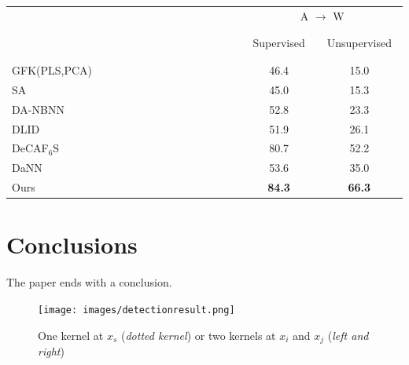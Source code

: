 \documentclass[runningheads]{llncs}
\begin{document}
\begin{table}
\centering
\begin{tabular}{l c c}
  \hline
   & \multicolumn{2}{c}{A $\rightarrow$ W}    \\
   \cline{2-3}
   ~~~~~~~~~~~~~~~~~~~~~~~~~~~~~~~
   ~~~~~~~~~~~~~~~~~~~~~~~~~~~~~~~
    & ~Supervised~ & ~Unsupervised~ \\
  \hline
  GFK(PLS,PCA)\cite{gong2012geodesic} & 46.4 & 15.0 \\
  SA \cite{fernando2013unsupervised} & 45.0 & 15.3 \\
  DA-NBNN \cite{tommasi2013frustratingly} & 52.8 & 23.3 \\
  DLID \cite{chopra2013dlid}& 51.9 & 26.1 \\
  DeCAF${}_{6}$S \cite{donahue2013decaf} & 80.7 & 52.2 \\
  DaNN \cite{ghifary2014domain}& 53.6 & 35.0 \\
  \hline
  Ours & {\bf 84.3} & {\bf 66.3} \\
  \hline
\end{tabular}
\end{table}


\section{Conclusions}
\label{section:Conclusions}

The paper ends with a conclusion.

\begin{figure}
\centering
\texttt{[image: images/detectionresult.png]}
\caption{One kernel at $x_s$ ({\it dotted kernel}) or two kernels at
$x_i$ and $x_j$ ({\it left and right}) }
\label{fig:example}
\end{figure}



\end{document}
